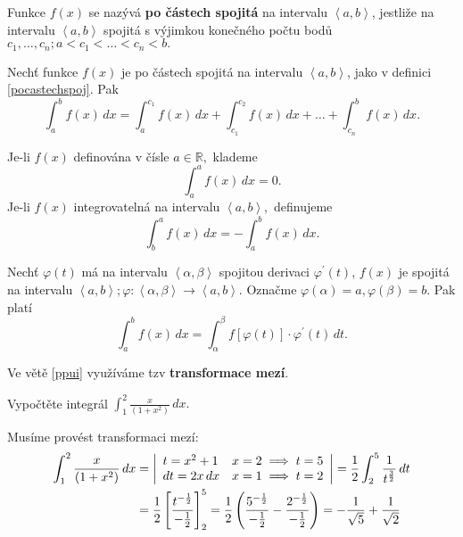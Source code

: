 \begin{definition}\label{pocastechspoj}
Funkce $f(x)$ se nazývá \textbf{po částech spojitá} na intervalu $\left < a,b \right > $,
jestliže na intervalu $\left < a,b \right > $ spojitá s výjimkou konečného počtu
bodů $c_1,\dots,c_n; a<c_1<\dots<c_n<b.$
\end{definition}

\begin{veta}
Nechť funkce $f(x)$ je po částech spojitá na intervalu $\left < a,b \right > $, jako
v definici \ref{pocastechspoj}. Pak
$$\int_a^b f(x)\, dx = \int_a^{c_1}f(x)\, dx + \int_{c_1}^{c_2}f(x)\, dx + \dots + \int_{c_n}^b f(x)\, dx.$$
\end{veta}

\begin{definition}
Je-li $f(x)$ definována v čísle $a \in \mathbb R,$ klademe
$$\int _a ^a f(x)\, dx = 0.$$
Je-li $f(x)$ integrovatelná na intervalu $\left < a,b \right > ,$ definujeme
$$\int_b^a f(x)\, dx = -\int_a^b f(x)\, dx.$$
\end{definition}


\begin{veta}\label{ppui}
Nechť $\varphi (t)$ má na intervalu $\left < \alpha, \beta  \right > $ spojitou derivaci
$\varphi^\prime (t)$, $f(x)$ je spojitá na intervalu $\left < a,b \right >;
\varphi: \left < \alpha, \beta \right >\to \left < a,b \right >  $. Označme
$\varphi(\alpha)=a, \varphi(\beta)=b.$ Pak platí
$$\int _a ^b f(x)\, dx = \int _\alpha ^\beta f \left [ \varphi(t) \right ]\cdot \varphi^\prime (t)\, dt. $$
\end{veta}

\begin{pozn}
    Ve větě \ref{ppui} využíváme tzv \textbf{transformace mezí}.
\end{pozn}

\begin{priklad}
Vypočtěte integrál $\int _1^2 \frac{x}{(1+x^2)}\, dx.$
\end{priklad}

\begin{reseni}
Musíme provést transformaci mezí:
\begin{align*}
\int _1^2 \frac{x}{(1+x^2)}\, dx &= \left |\begin{array}{l l}
    t=x^2+1 & x=2\implies t=5 \\
    dt = 2x \, dx & x=1\implies t=2
\end{array}\right | = \frac{1}{2}\int _2^5 \frac{1}{t^{\frac{3}{2}}}\, dt \\
&= \frac{1}{2}\left [ \frac{t^{-\frac{1}{2}}}{-\frac{1}{2}} \right ] _2^5 = \frac{1}{2}\left ( \frac{5^{-\frac{1}{2}}}{-\frac{1}{2}}-\frac{2^{-\frac{1}{2}}}{-\frac{1}{2}} \right )=-\frac{1}{\sqrt{5} }+\frac{1}{\sqrt{2} }
\end{align*}
\end{reseni}

